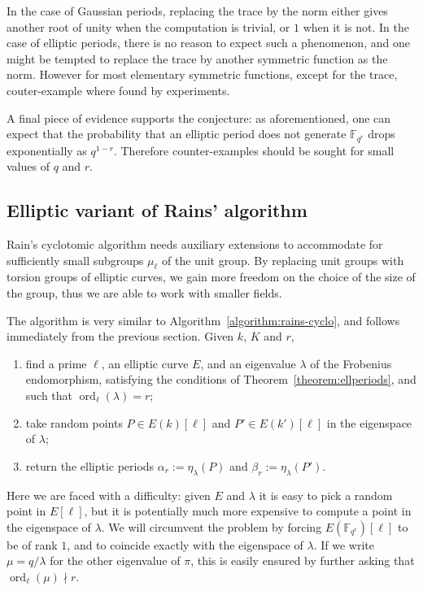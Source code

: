 \documentclass[12pt]{article}
\theoremstyle{plain}
\theoremstyle{definition}
\DeclareMathOperator{\order}{ord} %
\def\F{\ensuremath{\mathbb{F}}}
\newcounter{algorithm}
\begin{document}
In the case of Gaussian periods, replacing the trace by the norm
either gives another root of unity when the computation is trivial,
or $1$ when it is not.
In the case of elliptic periods, there is no reason to expect such a
phenomenon, and one might be tempted to replace the trace by
another symmetric function as the norm.
However for most elementary symmetric functions, except for the trace,
couter-example where found by experiments.

A final piece of evidence supports the conjecture:
as aforementioned, one can expect that the probability that an elliptic
period does not generate $\F_{q^r}$ drops exponentially as $q^{1-r}$.
Therefore counter-examples should be sought for small values of
$q$ and $r$.

\subsection{Elliptic variant of Rains' algorithm}

Rain's cyclotomic algorithm needs auxiliary extensions to accommodate
for sufficiently small subgroups $\mu_\ell$ of the unit group. By
replacing unit groups with torsion groups of elliptic curves, we gain
more freedom on the choice of the size of the group, thus we are able
to work with smaller fields.  

The algorithm is very similar to
Algorithm~\ref{algorithm:rains-cyclo}, and follows immediately from
the previous section. Given $k$, $K$ and $r$,
\begin{enumerate}
\item find a prime $\ell$, an elliptic curve $E$, and an eigenvalue
  $\lambda$ of the Frobenius endomorphism, satisfying the conditions
  of Theorem~\ref{theorem:ellperiods}, and such that
  $\order_\ell(\lambda)=r$;
\item take random points $P\in E(k)[\ell]$ and $P'\in E(k')[\ell]$ in
  the eigenspace of $\lambda$;
\item return the elliptic periods $\alpha_r := \eta_{\lambda}(P)$ and
  $\beta_r:= \eta_\lambda(P')$.
\end{enumerate}

Here we are faced with a difficulty: given $E$ and $\lambda$ it is
easy to pick a random point in $E[\ell]$, but it is potentially much
more expensive to compute a point in the eigenspace of $\lambda$. We
will circumvent the problem by forcing $E(\F_{q^r})[\ell]$ to be of
rank $1$, and to coincide exactly with the eigenspace of $\lambda$.
If we write $\mu = q/\lambda$ for the other eigenvalue of $\pi$, this
is easily ensured by further asking that $\order_\ell(\mu) \nmid r$.
\end{document}
